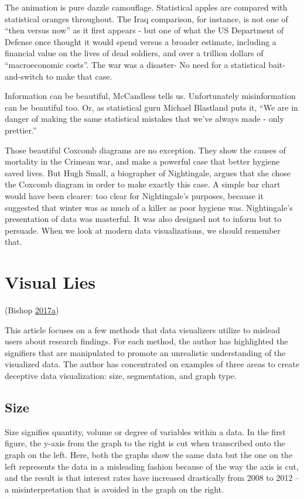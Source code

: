 \documentclass[]{book}
\begin{document}
The animation is pure dazzle camouflage. Statistical apples are compared
with statistical oranges throughout. The Iraq comparison, for instance,
is not one of ``then versus now'' as it first appears - but one of what
the US Department of Defense once thought it would spend versus a
broader estimate, including a financial value on the lives of dead
soldiers, and over a trillion dollars of ``macroeconomic costs''. The
war was a disaster- No need for a statistical bait-and-switch to make
that case.

Information can be beautiful, McCandless tells us. Unfortunately
misinformation can be beautiful too. Or, as statistical guru Michael
Blastland puts it, ``We are in danger of making the same statistical
mistakes that we've always made - only prettier.''

Those beautiful Coxcomb diagrams are no exception. They show the causes
of mortality in the Crimean war, and make a powerful case that better
hygiene saved lives. But Hugh Small, a biographer of Nightingale, argues
that she chose the Coxcomb diagram in order to make exactly this case. A
simple bar chart would have been clearer: too clear for Nightingale's
purposes, because it suggested that winter was as much of a killer as
poor hygiene was. Nightingale's presentation of data was masterful. It
was also designed not to inform but to persuade. When we look at modern
data visualizations, we should remember that.

\section{Visual Lies}\label{visual-lies}

(Bishop
\protect\hyperlink{ref-visual-lies}{2017}\protect\hyperlink{ref-visual-lies}{a})

This article focuses on a few methods that data visualizers utilize to
mislead users about research findings. For each method, the author has
highlighted the signifiers that are manipulated to promote an
unrealistic understanding of the visualized data. The author has
concentrated on examples of three areas to create deceptive data
visualization: size, segmentation, and graph type.

\subsection{Size}\label{size}

Size signifies quantity, volume or degree of variables within a data. In
the first figure, the y-axis from the graph to the right is cut when
transcribed onto the graph on the left. Here, both the graphs show the
same data but the one on the left represents the data in a misleading
fashion because of the way the axis is cut, and the result is that
interest rates have increased drastically from 2008 to 2012 -- a
misinterpretation that is avoided in the graph on the right.
\end{document}
